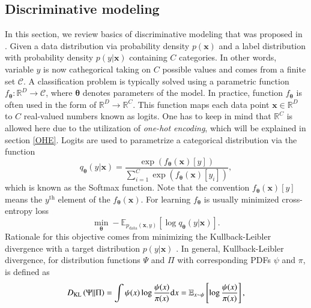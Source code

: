 \subsection{Discriminative modeling}
In this section, we review basics of discriminative modeling that was proposed in \cite{HDGEmain}. Given a data distribution via probability density $p(\boldsymbol{x})$ and a label distribution with probability density $p(y|\boldsymbol{x})$ containing $C$ categories. In other words, variable $y$ is now cathegorical taking on $C$ possible values and comes from a finite set $\mathcal{C}$.  A classification problem is typically solved using a parametric function $f_{\boldsymbol{\theta}} : \mathbb{R}^D \to \mathcal{C}$, where $\boldsymbol{\theta}$ denotes parameters of the model. In practice, function $f_{\boldsymbol{\theta}}$ is often used in the form of $\mathbb{R}^D \to  \mathbb{R}^C$. This function maps each data point $\boldsymbol{x} \in \mathbb{R}^D$ to $C$ real-valued numbers known as logits. One has to keep in mind that $\mathbb{R}^C$ is allowed here due to the utilization of \emph{one-hot encoding}, which will be explained in section \ref{OHE}. Logits are used to parametrize a categorical distribution via the function
\begin{equation}\label{softmax}
	q_{\boldsymbol{\theta}}\left(y|\boldsymbol{x}\right) = \frac{\exp\left({f_{\boldsymbol{\theta}}\left(\boldsymbol{x}\right)[y]}\right)}{\sum_{i=1}^C\exp\left({f_{\boldsymbol{\theta}}\left(\boldsymbol{x}\right)[y_i]}\right)},
\end{equation}
which is known as the Softmax function. Note that the convention $f_{\boldsymbol{\theta}}\left(\boldsymbol{x}\right)[y]$ means the $y^{\mathrm{th}}$ element of the $f_{\boldsymbol{\theta}}\left(\boldsymbol{x}\right)$. For learning $f_{\boldsymbol{\theta}}$ is usually minimized cross-entropy loss 
\begin{equation}\label{crossentropy}
	\min_{\boldsymbol{\theta}}- \mathbb{E}_{ p_{\mathrm{data}}(\boldsymbol{x},y)}\left[\log q_{\boldsymbol{\theta}}\left(y|\boldsymbol{x}\right)\right].
\end{equation} 
Rationale for this objective comes from minimizing the Kullback-Leibler divergence with a target distribution $p(y| \boldsymbol{x})$ \cite{KL}. In general,
Kullback-Leibler divergence, for distribution functions $\Psi$ and $\Pi$ with corresponding PDFs $\psi$ and $\pi$, is defined as
\begin{equation}
D_{\mathrm{KL}} \left(\Psi || \Pi \right) = \int \psi(x)\log\frac{\psi(x)}{\pi(x)}\mathrm{d}{x} = \mathbb{E}_{x\sim \psi} \left[\log\frac{\psi(x)}{\pi(x)} \right],
\end{equation}
